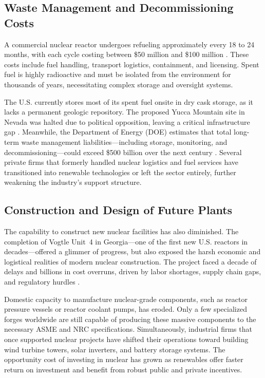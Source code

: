 \documentclass[12pt]{article}
\begin{document}
\subsection{Waste Management and Decommissioning Costs}
\label{sec:wastemanagement}

A commercial nuclear reactor undergoes refueling approximately every 18 to 24 months, with each cycle costing between \$50 million and \$100 million \autocite{wnisr2022}. These costs include fuel handling, transport logistics, containment, and licensing. Spent fuel is highly radioactive and must be isolated from the environment for thousands of years, necessitating complex storage and oversight systems.

The U.S. currently stores most of its spent fuel onsite in dry cask storage, as it lacks a permanent geologic repository. The proposed Yucca Mountain site in Nevada was halted due to political opposition, leaving a critical infrastructure gap \autocite{doe2020}. Meanwhile, the Department of Energy (DOE) estimates that total long-term waste management liabilities—including storage, monitoring, and decommissioning—could exceed \$500 billion over the next century \autocite{doe2020}. Several private firms that formerly handled nuclear logistics and fuel services have transitioned into renewable technologies or left the sector entirely, further weakening the industry’s support structure.

\subsection{Construction and Design of Future Plants}

The capability to construct new nuclear facilities has also diminished. The completion of Vogtle Unit~4 in Georgia—one of the first new U.S. reactors in decades—offered a glimmer of progress, but also exposed the harsh economic and logistical realities of modern nuclear construction. The project faced a decade of delays and billions in cost overruns, driven by labor shortages, supply chain gaps, and regulatory hurdles \autocite{aafnuclearcosts}.

Domestic capacity to manufacture nuclear-grade components, such as reactor pressure vessels or reactor coolant pumps, has eroded. Only a few specialized forges worldwide are still capable of producing these massive components to the necessary ASME and NRC specifications. Simultaneously, industrial firms that once supported nuclear projects have shifted their operations toward building wind turbine towers, solar inverters, and battery storage systems. The opportunity cost of investing in nuclear has grown as renewables offer faster return on investment and benefit from robust public and private incentives.
\end{document}
